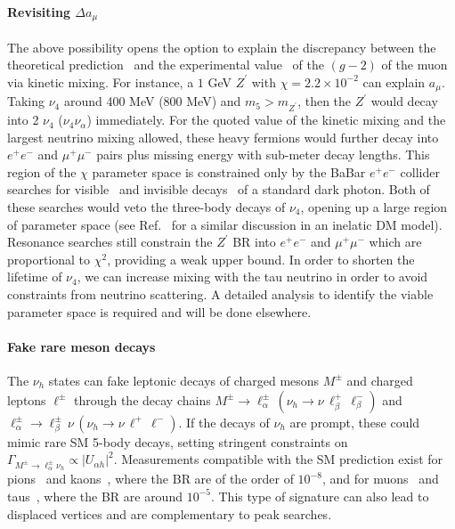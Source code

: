 \paragraph{Revisiting $\Delta a_\mu$} The above possibility opens the option to explain the discrepancy between the theoretical prediction~\cite{Blum:2018mom,Keshavarzi:2018mgv} and the experimental value~\cite{Bennett:2006fi} of the $(g-2)$ of the muon via kinetic mixing. For instance, a $1$ GeV $Z^\prime$ with $\chi = 2.2\times10^{-2}$ can explain $a_\mu$. Taking $\nu_4$ around 400 MeV (800 MeV) and $m_5 > m_{Z^\prime}$, then the $Z^\prime$ would decay into 2 $\nu_4$ ($\nu_4 \nu_\alpha$) immediately. For the quoted value of the kinetic mixing and the largest neutrino mixing allowed, these heavy fermions would further decay into $e^+ e^-$ and $\mu^+ \mu^-$ pairs plus missing energy with sub-meter decay lengths.  This region of the $\chi$ parameter space is constrained only by the BaBar $e^+e^-$ collider searches for visible~\cite{Lees:2014xha} and invisible decays~\cite{Lees:2017lec} of a standard dark photon. Both of these searches would veto the three-body decays of $\nu_4$, opening up a large region of parameter space (see Ref.~\cite{Mohlabeng:2019vrz} for a similar discussion in an inelatic DM model). Resonance searches still constrain the $Z^\prime$ BR into $e^+ e^-$ and $\mu^+ \mu^-$ which are proportional to $\chi^2$, providing a weak upper bound. In order to shorten the lifetime of $\nu_4$, we can increase mixing with the tau neutrino in order to avoid constraints from neutrino scattering. A detailed analysis to identify the viable parameter space is required and will be done elsewhere.

\paragraph{Fake rare meson decays} The $\nu_h$ states can fake leptonic decays of charged mesons $M^\pm$ and charged leptons $\ell^\pm$ through the decay chains $M^\pm \to \ell^\pm_\alpha \, (\nu_h \to \nu\, \ell^+_\beta\, \ell^-_\beta)$ and $\ell^\pm_\alpha \to \ell^\pm_\beta\, \nu\, (\nu_h \to \nu\, \ell^+ \, \ell^-)$. If the decays of $\nu_h$ are prompt, these could mimic rare SM 5-body decays, setting stringent constraints on $\Gamma_{M^\pm \to \ell^\pm_\alpha \nu_h} \propto |U_{\alpha h}|^2$. Measurements compatible with the SM prediction exist for pions~\cite{Egli:1986nk,Grab:1986si} and kaons~\cite{Poblaguev:2002ug,Ma:2005iv,Peruzzo:2017qis}, where the BR are of the order of $10^{-8}$, and for muons~\cite{Bertl:1985mw} and taus~\cite{Alam:1995mt}, where the BR are around $10^{-5}$. This type of signature can also lead to displaced vertices and are complementary to peak searches. 

